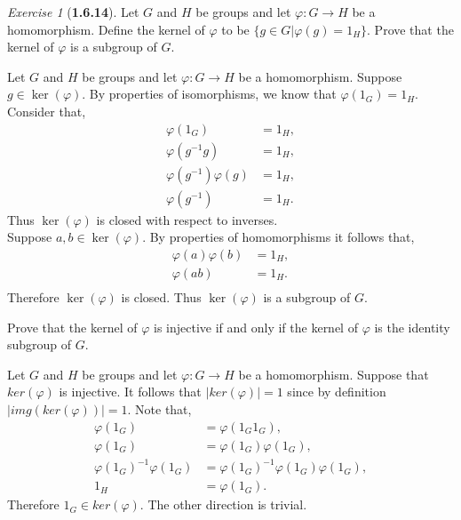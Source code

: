 \documentclass[12pt]{amsart}
\makeatletter
\theoremstyle{remark}
\newtheorem*{exercise}{Exercise}%
\renewenvironment{proof}[1][\proofname]{\par\doublespacing
  \pushQED{\qed}%
  \normalfont \topsep6\p@\@plus6\p@\relax
  \list{}{%
    \settowidth{\leftmargin}{\itshape\proofname:\hskip\labelsep}%
    \setlength{\labelwidth}{0pt}%
    \setlength{\itemindent}{-\leftmargin}%
  }%
  \item[\hskip\labelsep\itshape#1\@addpunct{:}]\ignorespaces
}{%
  \popQED\endlist\@endpefalse
  \singlespacing
}
\theoremstyle{mycomment}
\makeatother
\begin{document}
\begin{exercise}[\textbf{1.6.14}] Let $G$ and $H$ be groups and let $\varphi: G \to H$ be a homomorphism. Define the kernel of $\varphi$ to be $\{g \in G | \varphi(g) = 1_H\}$.
  Prove that the kernel of $\varphi$ is a subgroup of $G$.
  \begin{proof} Let $G$ and $H$ be groups and let $\varphi: G \to H$ be a homomorphism. Suppose $g \in \ker(\varphi)$. By properties of isomorphisms, we know that $\varphi(1_G) = 1_H$. Consider that, 
    \begin{align*}
      \varphi(1_G) &= 1_H,\\
      \varphi(g^{-1}g) &= 1_H,\\
      \varphi(g^{-1})\varphi(g) &= 1_H,\\
      \varphi(g^{-1}) &= 1_H.
    \end{align*}
Thus $\ker(\varphi)$ is closed with respect to inverses.\\
Suppose $a,b \in \ker(\varphi)$. By properties of homomorphisms it follows that, 
\begin{align*}
  \varphi(a)\varphi(b) &= 1_H,\\
  \varphi(ab) &= 1_H.\\
\end{align*}
Therefore $\ker(\varphi)$ is closed. Thus $\ker(\varphi)$ is a subgroup of $G$.
\end{proof}


Prove that the kernel of $\varphi$ is injective if and only if the kernel of $\varphi$ is the identity subgroup of $G$.
\begin{proof}  Let $G$ and $H$ be groups and let $\varphi: G \to H$ be a homomorphism. Suppose that $ker(\varphi)$ is injective. It follows that $|ker(\varphi)| = 1$ since by definition 
  $|img(ker(\varphi))| = 1$. Note that,
  \begin{align*}
    \varphi(1_G) &= \varphi(1_G1_G),\\
    \varphi(1_G) &= \varphi(1_G)\varphi(1_G),\\
    \varphi(1_G)^{-1}\varphi(1_G) &= \varphi(1_G)^{-1}\varphi(1_G)\varphi(1_G),\\
    1_H &= \varphi(1_G).
  \end{align*}
  Therefore $1_G \in ker(\varphi)$. The other direction is trivial. 
\end{proof}
\end{exercise}
\vspace{.15in}
\end{document}
